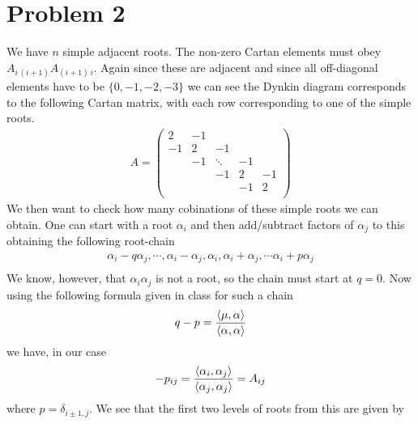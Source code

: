 \documentclass[a4paper,12pt]{article}
\begin{document}
\section*{Problem 2}
We have $n$ simple adjacent roots. The non-zero Cartan elements must obey $A_{i\,(i+1)}A_{(i+1)\,i}$. Again since these are adjacent and since all off-diagonal elements have to be $\{0,-1,-2,-3\}$ we can see the Dynkin diagram corresponds to the following Cartan matrix, with each row corresponding to one of the simple roots.
\begin{equation}
	\begin{aligned}
		A=\begin{pmatrix}
			2 & -1 & & &\\
			-1 & 2 & -1 & &\\
			 &  -1& \ddots  &-1 &\\
			 & & -1 & 2&-1\\
			 & &  &-1 & 2\\
		\end{pmatrix}
	\end{aligned}
\end{equation}
We then want to check how many cobinations of these simple roots we can obtain. One can start with a root $\alpha_i$ and then add/subtract factors of $\alpha_j$ to this obtaining the following root-chain
\begin{equation}
	\begin{aligned}
	\alpha_i-q\alpha_j,\cdots,\alpha_i -\alpha_j,	\alpha_i,\alpha_i +\alpha_j,\cdots \alpha_i+p\alpha_j\\
	\end{aligned}
\end{equation}
We know, however, that $\alpha_i\alpha_j$ is not a root, so the chain must start at $q=0$. Now using the following formula given in class for such a chain
\begin{equation}  \label{eq:minw}
	\begin{aligned}
		q-p=\frac{\expval{\mu,\alpha}}{\expval{\alpha,\alpha}}
	\end{aligned}
\end{equation}
we have, in our case
\begin{equation}  \label{eq:minw}
	\begin{aligned}
		-p_{ij}=\frac{\expval{\alpha_i,\alpha_j}}{\expval{\alpha_j,\alpha_j}}=A_{ij}
	\end{aligned}
\end{equation}
where $p=\delta_{i\pm 1,j}$. We see that the first two levels of roots from this are given by
\end{document}
